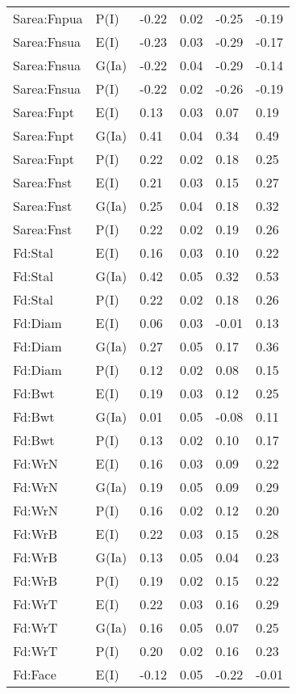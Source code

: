 \begin{center}
\begin{longtable}{|p{1.1in}|p{0.7in}|p{0.7in}|p{0.6in}|p{0.6in}|p{0.6in}|}
  Sarea:Fnpua & P(I) & -0.22 & 0.02 & -0.25 & -0.19 \\ 
  Sarea:Fnsua & E(I) & -0.23 & 0.03 & -0.29 & -0.17 \\ 
  Sarea:Fnsua & G(Ia) & -0.22 & 0.04 & -0.29 & -0.14 \\ 
  Sarea:Fnsua & P(I) & -0.22 & 0.02 & -0.26 & -0.19 \\ 
  Sarea:Fnpt & E(I) & 0.13 & 0.03 & 0.07 & 0.19 \\ 
  Sarea:Fnpt & G(Ia) & 0.41 & 0.04 & 0.34 & 0.49 \\ 
  Sarea:Fnpt & P(I) & 0.22 & 0.02 & 0.18 & 0.25 \\ 
  Sarea:Fnst & E(I) & 0.21 & 0.03 & 0.15 & 0.27 \\ 
  Sarea:Fnst & G(Ia) & 0.25 & 0.04 & 0.18 & 0.32 \\ 
  Sarea:Fnst & P(I) & 0.22 & 0.02 & 0.19 & 0.26 \\ 
  Fd:Stal & E(I) & 0.16 & 0.03 & 0.10 & 0.22 \\ 
  Fd:Stal & G(Ia) & 0.42 & 0.05 & 0.32 & 0.53 \\ 
  Fd:Stal & P(I) & 0.22 & 0.02 & 0.18 & 0.26 \\ 
  Fd:Diam & E(I) & 0.06 & 0.03 & -0.01 & 0.13 \\ 
  Fd:Diam & G(Ia) & 0.27 & 0.05 & 0.17 & 0.36 \\ 
  Fd:Diam & P(I) & 0.12 & 0.02 & 0.08 & 0.15 \\ 
  Fd:Bwt & E(I) & 0.19 & 0.03 & 0.12 & 0.25 \\ 
  Fd:Bwt & G(Ia) & 0.01 & 0.05 & -0.08 & 0.11 \\ 
  Fd:Bwt & P(I) & 0.13 & 0.02 & 0.10 & 0.17 \\ 
  Fd:WrN & E(I) & 0.16 & 0.03 & 0.09 & 0.22 \\ 
  Fd:WrN & G(Ia) & 0.19 & 0.05 & 0.09 & 0.29 \\ 
  Fd:WrN & P(I) & 0.16 & 0.02 & 0.12 & 0.20 \\ 
  Fd:WrB & E(I) & 0.22 & 0.03 & 0.15 & 0.28 \\ 
  Fd:WrB & G(Ia) & 0.13 & 0.05 & 0.04 & 0.23 \\ 
  Fd:WrB & P(I) & 0.19 & 0.02 & 0.15 & 0.22 \\ 
  Fd:WrT & E(I) & 0.22 & 0.03 & 0.16 & 0.29 \\ 
  Fd:WrT & G(Ia) & 0.16 & 0.05 & 0.07 & 0.25 \\ 
  Fd:WrT & P(I) & 0.20 & 0.02 & 0.16 & 0.23 \\ 
  Fd:Face & E(I) & -0.12 & 0.05 & -0.22 & -0.01 \\ 

\end{longtable}
\end{center}
